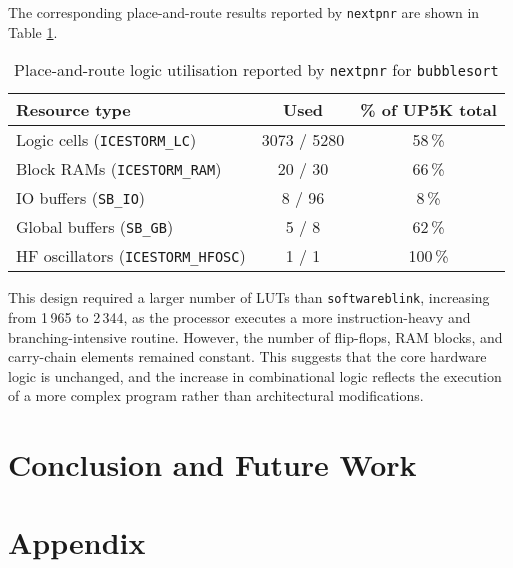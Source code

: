 \documentclass[a4paper,10pt]{article}
\begin{document}
The corresponding place-and-route results reported by 
\texttt{nextpnr} are shown in Table \ref{tab:bubblesort_pnr_report}.


\begin{table}[H]
    \centering
    \begin{tabularx}{0.7\textwidth}{X c c}
        \toprule
        Resource type & Used & \% of UP5K total \\ \midrule
        Logic cells (\texttt{ICESTORM\_LC}) & 3073 / 5280 & 58\,\% \\
        Block RAMs (\texttt{ICESTORM\_RAM}) & 20 / 30 & 66\,\% \\
        IO buffers (\texttt{SB\_IO}) & 8 / 96 & 8\,\% \\
        Global buffers (\texttt{SB\_GB}) & 5 / 8 & 62\,\% \\
        HF oscillators (\texttt{ICESTORM\_HFOSC}) & 1 / 1 & 100\,\% \\
        \bottomrule
    \end{tabularx}
    \caption{Place-and-route logic utilisation reported by 
    \texttt{nextpnr} for \texttt{bubblesort}}
    \label{tab:bubblesort_pnr_report}
\end{table}

This design required a larger number of LUTs than 
\texttt{softwareblink}, increasing from 1\,965 to 2\,344, 
as the processor executes a more instruction-heavy and 
branching-intensive routine. 
However, the number of flip-flops, RAM blocks, 
and carry-chain elements remained constant. 
This suggests that the core hardware logic is unchanged, 
and the increase in combinational logic reflects 
the execution of a more complex program 
rather than architectural modifications.

\section{Conclusion and Future Work}
\label{sec:Conclusion_and_Future_Work}

\appendix
\section{Appendix}
\end{document}
